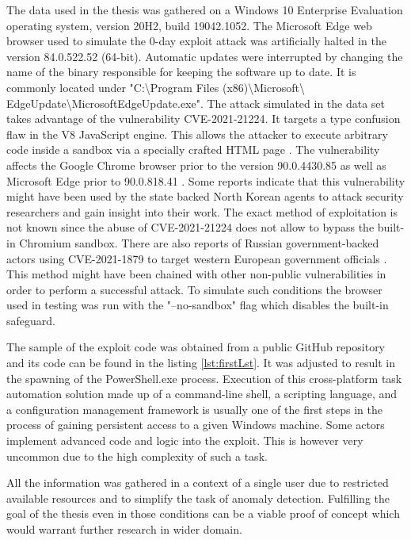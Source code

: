 \documentclass[a4paper,twoside,12pt]{book}
\begin{document}
The data used in the thesis was gathered on a Windows 10 Enterprise Evaluation operating 
system, version 20H2, build 19042.1052. The Microsoft Edge web browser used to simulate 
the 0-day exploit attack was artificially halted in the version 84.0.522.52 (64-bit). 
Automatic updates were interrupted by changing the name of the binary responsible for 
keeping the software up to date. It is commonly located under 
"C:\textbackslash Program Files (x86)\textbackslash Microsoft\textbackslash 
EdgeUpdate\textbackslash MicrosoftEdgeUpdate.exe". 
The attack simulated in the data set takes advantage of the vulnerability CVE-2021-21224. It 
targets a type confusion flaw in the V8 JavaScript engine. This allows the attacker to 
execute arbitrary code inside a sandbox via a specially crafted HTML page \cite{bib:CVE21224}. 
The vulnerability affects the Google Chrome browser prior to the version 90.0.4430.85 as 
well as Microsoft Edge prior to 90.0.818.41 \cite{bib:edgeRelease}. Some reports indicate 
that this vulnerability might have been used by the state backed North Korean agents to 
attack security researchers and gain insight into their work. The exact method of
exploitation is not known since the abuse of CVE-2021-21224 does not allow to bypass 
the built-in Chromium sandbox. There are also reports of Russian government-backed actors 
using CVE-2021-1879 to target western European government officials \cite{bib:googleBlog}. 
This method might have been chained with other non-public vulnerabilities in order to 
perform a successful attack. To simulate such conditions the browser used in testing was 
run with the "--no-sandbox" flag which disables the built-in safeguard.

The sample of the exploit code was obtained from a public GitHub repository 
\cite{bib:sampleExploit} and its code can be found in the listing \ref{lst:firstLst}. 
It was adjusted to result in the spawning of the PowerShell.exe process. Execution of this 
cross-platform task automation solution made up of a command-line shell, a scripting 
language, and a configuration management framework is usually one of the first steps in 
the process of gaining persistent access to a given Windows machine. Some actors implement advanced 
code and logic into the exploit. This is however very uncommon due to the high complexity 
of such a task.

All the information was gathered in a context of a single user due to restricted available
resources and to simplify the task of anomaly detection. Fulfilling the goal of the thesis
even in those conditions can be a viable proof of concept which would warrant further 
research in wider domain.  
\end{document}
